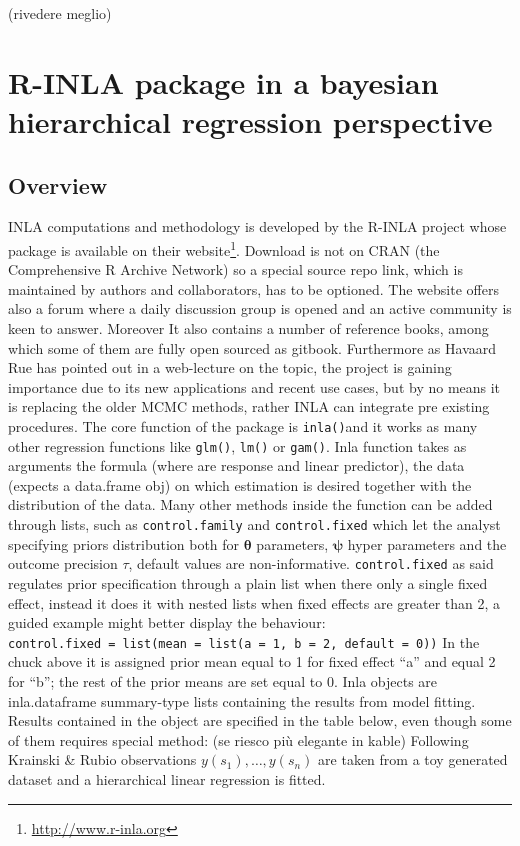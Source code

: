 \documentclass[
  12pt,
  a4paper,
  oneside]{book}
\DeclareRobustCommand{\href}[2]{#2\footnote{\url{#1}}}
\begin{document}
(rivedere meglio)

\hypertarget{rinla}{%
\section{R-INLA package in a bayesian hierarchical regression perspective}\label{rinla}}

\hypertarget{overview}{%
\subsection{Overview}\label{overview}}

INLA computations and methodology is developed by the R-INLA project whose package is available on their \href{http://www.r-inla.org}{website}. Download is not on CRAN (the Comprehensive R Archive Network) so a special source repo link, which is maintained by authors and collaborators, has to be optioned. The website offers also a forum where a daily discussion group is opened and an active community is keen to answer. Moreover It also contains a number of reference books, among which some of them are fully open sourced as gitbook. Furthermore as Havaard Rue has pointed out in a web-lecture on the topic, the project is gaining importance due to its new applications and recent use cases, but by no means it is replacing the older MCMC methods, rather INLA can integrate pre existing procedures.
The core function of the package is \texttt{inla()}and it works as many other regression functions like \texttt{glm()}, \texttt{lm()} or \texttt{gam()}. Inla function takes as arguments the formula (where are response and linear predictor), the data (expects a data.frame obj) on which estimation is desired together with the distribution of the data. Many other methods inside the function can be added through lists, such as \texttt{control.family} and \texttt{control.fixed} which let the analyst specifying priors distribution both for \(\boldsymbol{\theta}\) parameters, \(\boldsymbol{\psi}\) hyper parameters and the outcome precision \(\tau\), default values are non-informative.
\texttt{control.fixed} as said regulates prior specification through a plain list when there only a single fixed effect, instead it does it with nested lists when fixed effects are greater than 2, a guided example might better display the behaviour:
\texttt{control.fixed\ =\ list(mean\ =\ list(a\ =\ 1,\ b\ =\ 2,\ default\ =\ 0))}
In the chuck above it is assigned prior mean equal to 1 for fixed effect ``a'' and equal 2 for ``b''; the rest of the prior means are set equal to 0.
Inla objects are inla.dataframe summary-type lists containing the results from model fitting. Results contained in the object are specified in the table below, even though some of them requires special method: (se riesco più elegante in kable)
Following Krainski \& Rubio \citeyearpar{Krainski-Rubio} observations \(y(s_{1}), \ldots, y(s_{n})\) are taken from a toy generated dataset and a hierarchical linear regression is fitted.
\end{document}
